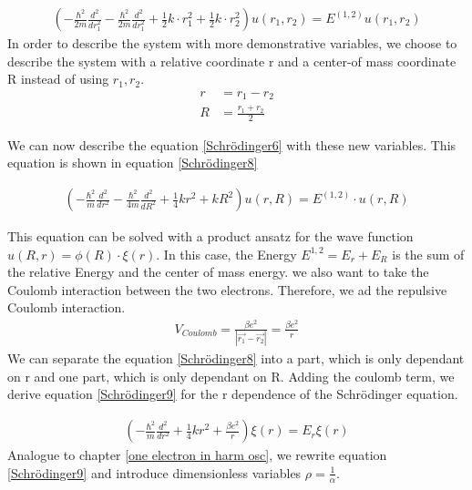 \documentclass[10pt,a4paper]{article}
\begin{document}
\begin{align}
	\left(-\frac{\hbar^2}{2 m}  \frac{d^2}{dr_1^2} -\frac{\hbar^2}{2 m}  \frac{d^2}{dr_1^2} + \frac{1}{2}k \cdot r_1^2+ \frac{1}{2}k \cdot r_2^2 \right) u(r_1,r_2)= E^{(1,2)} u(r_1,r_2) \label{Schrödinger7}
\end{align}
In order to describe the system with more demonstrative variables, we choose to describe the system with a relative coordinate r and a center-of mass coordinate R instead of using $r_1,r_2$. 
\begin{align}
	r &=r_1-r_2 \\
	R &= \frac{r_1+r_2}{2}
\end{align}

We can now describe the equation \ref{Schrödinger6} with these new variables. This equation is shown in equation \ref{Schrödinger8}

\begin{align}
	\left(-\frac{\hbar^2}{m} \frac{d^2}{dr^2}- \frac{\hbar^2}{4m} \frac{d^2}{dR^2}+\frac{1}{4}k r^2 + k R^2 \right) u (r,R) = E^{(1,2)} \cdot u(r,R) \label{Schrödinger8}
\end{align}

This equation can be solved with a product ansatz for the wave function $u(R,r)= \phi(R) \cdot \xi(r)$. In this case, the Energy $E^{1,2}=E_r+E_R$ is the sum of the relative Energy and the center of mass energy. 
we also want to take the Coulomb interaction between the two electrons. Therefore, we ad the repulsive Coulomb interaction. 
\begin{align}
	V_{Coulomb}= \frac{\beta e^2 }{|\vec{r_1}-\vec{r_2}|}= \frac{\beta e^2}{r}
\end{align}
We can separate the equation \ref{Schrödinger8} into a part, which is only dependant on r and one part, which is only dependant on R.  Adding the coulomb term, we derive equation \ref{Schrödinger9} for the r dependence of the Schrödinger equation. 

\begin{align}
	\left( - \frac{\hbar^2}{m} \frac{d^2}{dr^2}+ \frac{1}{4} k r^2 + \frac{\beta e^2}{r} \right) \xi(r)= E_r \xi(r) \label{Schrödinger9}
\end{align}
Analogue to chapter \ref{one electron in harm osc}, we rewrite equation \ref{Schrödinger9} and introduce dimensionless variables $\rho=\frac{1}{\alpha}$. 
\end{document}
